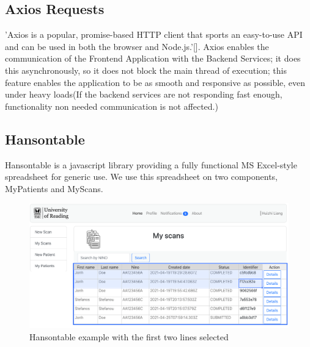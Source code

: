 		\subsection{Axios Requests}
			'Axios is a popular, promise-based HTTP client that sports an easy-to-use API and can be used in both the browser and 
			Node.js.'[\cite{jacques_2018}]. Axios enables the communication of the Frontend Application with the Backend Services; 
			it does this asynchronously, so it does not block the main thread of  execution; this feature enables the application to 
			be as smooth and responsive as possible, even under heavy loads(If the backend services are not responding fast enough, 
			functionality non needed communication is not affected.)
		\subsection{Hansontable}
			Hansontable is a javascript library providing a fully functional MS Excel-style spreadsheet for generic use. We use this spreadsheet on two 
			components, MyPatients and MyScans.
			\begin{figure}[H]
				\iftrue
				\caption{Hansontable example with the first two lines selected}
				\centering
				\includegraphics[scale=0.3]{figures/hansontable-example}
				\fi
			\end{figure}
			
			
			
			